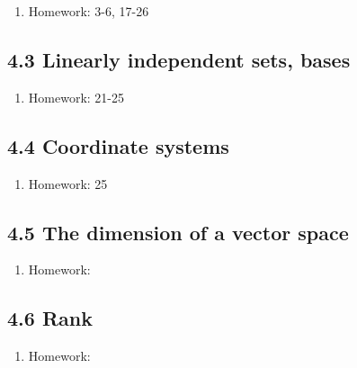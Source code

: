 \documentclass{article}
\begin{document}
\begin{enumerate}

\item Homework: 3-6, 17-26

\end{enumerate}

\subsection{4.3 Linearly independent sets, bases}

\begin{enumerate}

\item Homework: 21-25

\end{enumerate}

\subsection{4.4 Coordinate systems}

\begin{enumerate}

\item Homework: 25 

\end{enumerate}

\subsection{4.5 The dimension of a vector space}

\begin{enumerate}

\item Homework: 

\end{enumerate}

\subsection{4.6 Rank}

\begin{enumerate}

\item Homework: 

\end{enumerate}
\end{document}
